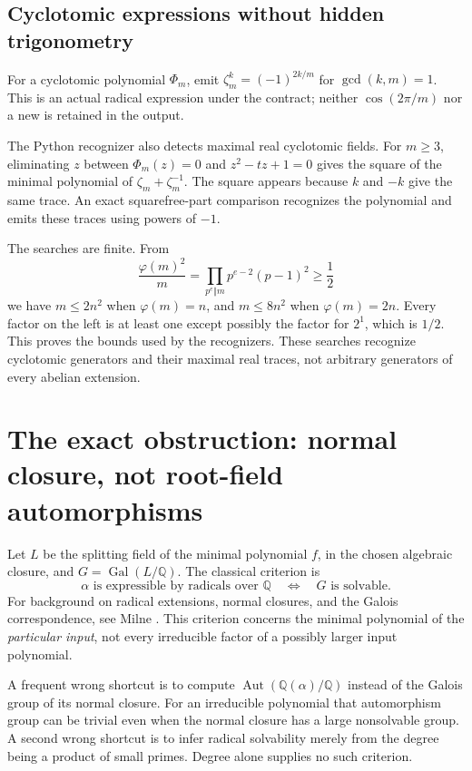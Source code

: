 \documentclass[11pt,letterpaper]{article}
\theoremstyle{definition}\newtheorem{definition}[theorem]{Definition}
\theoremstyle{remark}\newtheorem{remark}[theorem]{Remark}
\newcommand{\Q}{\mathbb Q}\newcommand{\C}{\mathbb C}\newcommand{\Z}{\mathbb Z}
\newcommand{\Gal}{\operatorname{Gal}}\newcommand{\Fix}{\operatorname{Fix}}
\begin{document}
\subsection{Cyclotomic expressions without hidden trigonometry}
For a cyclotomic polynomial \(\Phi_m\), emit
\(\zeta_m^k=(-1)^{2k/m}\) for \(\gcd(k,m)=1\). This is an actual radical
expression under the contract; neither \(\cos(2\pi/m)\) nor a new
 is retained in the output.

The Python recognizer also detects maximal real cyclotomic fields. For
\(m\ge3\), eliminating \(z\) between \(\Phi_m(z)=0\) and
\(z^2-tz+1=0\) gives the square of the minimal polynomial of
\(\zeta_m+\zeta_m^{-1}\). The square appears because \(k\) and \(-k\) give
the same trace. An exact squarefree-part comparison recognizes the polynomial
and emits these traces using powers of \(-1\).

The searches are finite. From
\[
 \frac{\varphi(m)^2}{m}
   =\prod_{p^e\Vert m}p^{e-2}(p-1)^2\ge\frac12
\]
we have \(m\le2n^2\) when \(\varphi(m)=n\), and \(m\le8n^2\) when
\(\varphi(m)=2n\). Every factor on the left is at least one except possibly
the factor for \(2^1\), which is \(1/2\). This proves the bounds used by the
recognizers. These searches recognize cyclotomic generators and their maximal
real traces, not arbitrary generators of every abelian extension.

\section{The exact obstruction: normal closure, not root-field automorphisms}
\label{sec:galois}
Let \(L\) be the splitting field of the minimal polynomial \(f\), in the
chosen algebraic closure, and \(G=\Gal(L/\Q)\).
The classical criterion is
\begin{equation}
 \alpha\text{ is expressible by radicals over }\Q
 \quad\Longleftrightarrow\quad G\text{ is solvable}.\label{eq:criterion}
\end{equation}
For background on radical extensions, normal closures, and the Galois
correspondence, see Milne \cite{milne}. This criterion concerns the minimal
polynomial of the \emph{particular input}, not every irreducible factor of a
possibly larger input polynomial.

A frequent wrong shortcut is to compute
\(\operatorname{Aut}(\Q(\alpha)/\Q)\) instead of the Galois group of its
normal closure. For an irreducible polynomial that automorphism group can be
trivial even when the normal closure has a large nonsolvable group. A second
wrong shortcut is to infer radical solvability merely from the degree being a
product of small primes. Degree alone supplies no such criterion.
\end{document}
